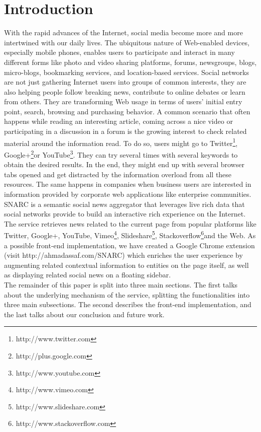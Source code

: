 \documentclass[oribibl]{llncs}
\begin{document}
\section{Introduction}
With the rapid advances of the Internet, social media become more and more intertwined with our daily lives. The ubiquitous nature of Web-enabled devices, especially mobile phones, enables users to participate and interact in many different forms like photo and video sharing platforms, forums, newsgroups, blogs, micro-blogs, bookmarking services, and location-based services. Social networks are not just gathering Internet users into groups of common interests, they are also helping people follow breaking news, contribute to online debates or learn from others. They are transforming Web usage in terms of users' initial entry point, search, browsing and purchasing behavior.\cite{Bakshy2012}
A common scenario that often happens while reading an interesting article, coming across a nice video or participating in a discussion in a forum is the growing interest to check related material around the information read. To do so, users might go to Twitter\footnote{http://www.twitter.com}, Google+\footnote{http://plus.google.com}or YouTube\footnote{http://www.youtube.com}. They can try several times with several keywords to obtain the desired results. In the end, they might end up with several browser tabs opened and get distracted by the information overload from all these resources. The same happens in companies when business users are interested in information provided by corporate web applications like enterprise communities. SNARC is a semantic social news aggregator that leverages live rich data that social networks provide to build an interactive rich experience on the Internet. The service retrieves news related to the current page from popular platforms like Twitter, Google+, YouTube, Vimeo\footnote{http://www.vimeo.com}, Slideshare\footnote{http://www.slideshare.com}, Stackoverflow\footnote{http://www.stackoverflow.com}and the Web. As a possible front-end implementation, we have created a Google Chrome extension (visit http://ahmadassaf.com/SNARC) which enriches the user experience by augmenting related contextual information to entities on the page itself, as well as displaying related social news on a floating sidebar. 
\\The remainder of this paper is split into three main sections. The first talks about the underlying mechanism of the service, splitting the functionalities into three main subsections. The second describes the front-end implementation, and the last talks about our conclusion and future work.
\end{document}
